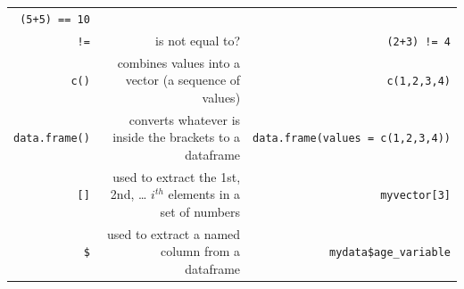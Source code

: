 \documentclass[12pt,]{krantz}
\begin{document}
\begin{longtable}[]{@{}rrr@{}}
\begin{minipage}[t]{0.30\columnwidth}
\texttt{(5+5)\ ==\ 10}\strut
\end{minipage}\tabularnewline
\begin{minipage}[t]{0.30\columnwidth}\raggedleft
\texttt{!=}\strut
\end{minipage} & \begin{minipage}[t]{0.30\columnwidth}\raggedleft
is not equal to?\strut
\end{minipage} & \begin{minipage}[t]{0.30\columnwidth}\raggedleft
\texttt{(2+3)\ !=\ 4}\strut
\end{minipage}\tabularnewline
\begin{minipage}[t]{0.30\columnwidth}\raggedleft
\texttt{c()}\strut
\end{minipage} & \begin{minipage}[t]{0.30\columnwidth}\raggedleft
combines values into a vector (a sequence of values)\strut
\end{minipage} & \begin{minipage}[t]{0.30\columnwidth}\raggedleft
\texttt{c(1,2,3,4)}\strut
\end{minipage}\tabularnewline
\begin{minipage}[t]{0.30\columnwidth}\raggedleft
\texttt{data.frame()}\strut
\end{minipage} & \begin{minipage}[t]{0.30\columnwidth}\raggedleft
converts whatever is inside the brackets to a dataframe\strut
\end{minipage} & \begin{minipage}[t]{0.30\columnwidth}\raggedleft
\texttt{data.frame(values\ =\ c(1,2,3,4))}\strut
\end{minipage}\tabularnewline
\begin{minipage}[t]{0.30\columnwidth}\raggedleft
\texttt{{[}{]}}\strut
\end{minipage} & \begin{minipage}[t]{0.30\columnwidth}\raggedleft
used to extract the 1st, 2nd, \ldots{} \(i^{th}\) elements in a set of numbers\strut
\end{minipage} & \begin{minipage}[t]{0.30\columnwidth}\raggedleft
\texttt{myvector{[}3{]}}\strut
\end{minipage}\tabularnewline
\begin{minipage}[t]{0.30\columnwidth}\raggedleft
\texttt{\$}\strut
\end{minipage} & \begin{minipage}[t]{0.30\columnwidth}\raggedleft
used to extract a named column from a dataframe\strut
\end{minipage} & \begin{minipage}[t]{0.30\columnwidth}\raggedleft
\texttt{mydata\$age\_variable}\strut
\end{minipage}\tabularnewline
\bottomrule
\end{longtable}
\end{document}
